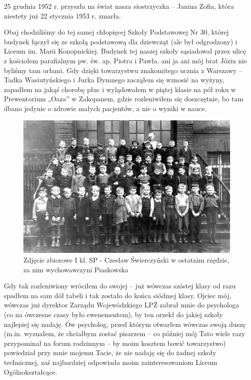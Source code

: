 25 grudnia 1952 r. przyszła na świat nasza siostrzyczka – Janina Zofia, która niestety już 22 stycznia 1953 r. zmarła.

Obaj chodziliśmy do tej samej chłopięcej Szkoły Podstawowej Nr 30, której budynek łączył się ze szkołą podstawową dla dziewcząt (ale był odgrodzony) i Liceum im. Marii Konopnickiej. Budynek tej naszej szkoły sąsiadował przez ulicę z kościołem parafialnym pw. św. ap. Piotra i Pawła. ani ja ani mój brat Józiu nie byliśmy tam orłami. Gdy dzięki towarzystwu znakomitego ucznia z Warszawy – Tadka Wasiutyńskiego i Jurka Dymnego zacząłem się wznosić na wyżyny, zapadłem na jakąś chorobę płuc i wylądowałem w piątej klasie na pół roku w Prewentorium „Oaza” w Zakopanem, gdzie rozleniwiłem się doszczętnie, bo tam dbano jedynie o zdrowie małych pacjentów, a nie o wyniki w nauce.
\begin{figure}[!h]
\begin{center}
\includegraphics[width=\textwidth]{photo/czeslaw_swierczynski_i_kl_sp.jpg}
\caption[Zdjęcie zbiorowe I kl. SP]{Zdjęcie zbiorowe I kl. SP - Czesław Świerczyński w ostatnim rzędzie, za nim wychowawczyni Piaskowska}
\end{center}
\end{figure}

Gdy tak rozleniwiony wróciłem do swojej – już wówczas szóstej klasy od razu spadłem na sam dół tabeli i tak zostało do końca siódmej klasy. Ojciec mój, wówczas już dyrektor Zarządu Wojewódzkiego LPŻ zabrał mnie do psychologa (co na ówczesne czasy było ewenementem), by ten orzekł do jakiej szkoły najlepiej się nadaję. Ów psycholog, przed którym otwarłem wówczas swoją duszę (m.in. wyznałem, że chciałbym zostać pisarzem – co później mój Tato wiele razy przypominał na forum rodzinnym – by moim kosztem bawić towarzystwo) powiedział przy mnie mojemu Tacie, że nie nadaję się do żadnej szkoły technicznej, zaś najbardziej odpowiada moim zainteresowaniom Liceum Ogólnokształcące. 


